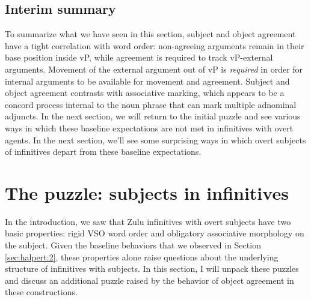 \documentclass[output=paper,colorlinks,citecolor=brown]{langscibook}
\begin{document}



%         



\subsection{Interim summary}\label{sec:halpert:2.4}

To summarize what we have seen in this section, subject and object agreement have a tight correlation with word order: non-agreeing arguments remain in their base position inside vP, while agreement is required to track vP-external arguments. Movement of the external argument out of vP is \textit{required} in order for internal arguments to be available for movement and agreement. Subject and object agreement contrasts with associative marking, which appears to be a concord process internal to the noun phrase that can mark multiple adnominal adjuncts. In the next section, we will return to the initial puzzle and see various ways in which these baseline expectations are not met in infinitives with overt agents. In the next section, we'll see some surprising ways in which overt subjects of infinitives depart from these baseline expectations.

\section{The puzzle: subjects in infinitives}\label{sec:halpert:3}

In the introduction, we saw that Zulu infinitives with overt subjects have two basic properties: rigid VSO word order and obligatory associative morphology on the subject.  Given the baseline behaviors that we observed in Section \ref{sec:halpert:2}, these properties alone raise questions about the underlying structure of infinitives with subjects.  In this section, I will unpack these puzzles and discuss an additional puzzle raised by the behavior of object agreement in these constructions.
\end{document}
